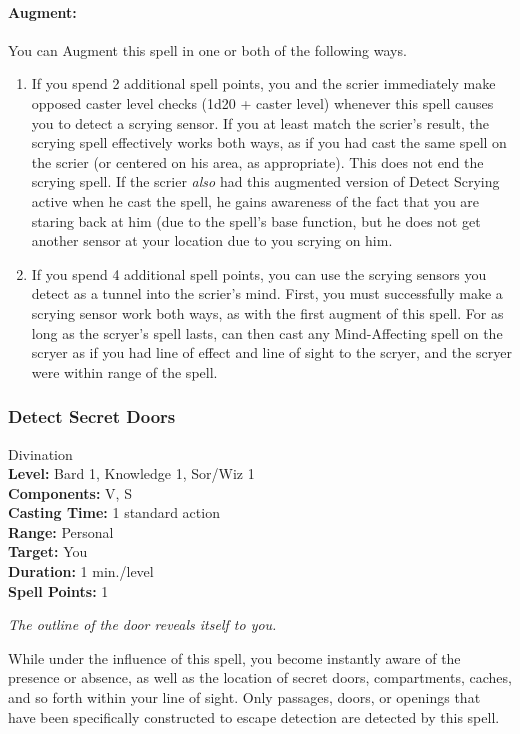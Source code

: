 \paragraph{Augment:} You can Augment this spell in one or both of the following ways.
\begin{enumerate}
 \item If you spend 2 additional spell points, 
you and the scrier immediately make opposed caster level checks (1d20 + caster level) whenever
this spell causes you to detect a scrying sensor. 
If you at least match the scrier's result, the scrying spell effectively works both ways,
as if you had cast the same spell on the scrier (or centered on his area, as appropriate).
This does not end the scrying spell. If the scrier \emph{also} had this augmented version of
Detect Scrying active when he cast the spell, he gains awareness of the fact that you are staring
back at him (due to the spell's base function, 
but he does not get another sensor at your location due to you scrying on him.
 \item If you spend 4 additional spell points, you can use the scrying sensors you detect as a tunnel into
the scrier's mind.
First, you must successfully make a scrying sensor work both ways, as with the first augment of this spell. 
For as long as the scryer's spell lasts, 
can then cast any Mind-Affecting spell on the scryer as if you had line of effect and line of sight to
the scryer, and the scryer were within range of the spell.
\end{enumerate}

\subsubsection{Detect Secret Doors}
\label{Spell:DetectSecretDoors}
Divination
\\ \textbf{Level:} Bard 1, Knowledge 1, Sor/Wiz 1
\\ \textbf{Components:} V, S
\\ \textbf{Casting Time:} 1 standard action
\\ \textbf{Range:} Personal
\\ \textbf{Target:} You
\\ \textbf{Duration:} 1 min./level
\\ \textbf{Spell Points:} 1

\emph{The outline of the door reveals itself to you.}

While under the influence of this spell, you become instantly aware of the presence or absence, 
as well as the location of secret doors, compartments, caches, and so forth within your line of sight. 
Only passages, doors, or openings that have been specifically constructed to escape detection are detected by this spell.

